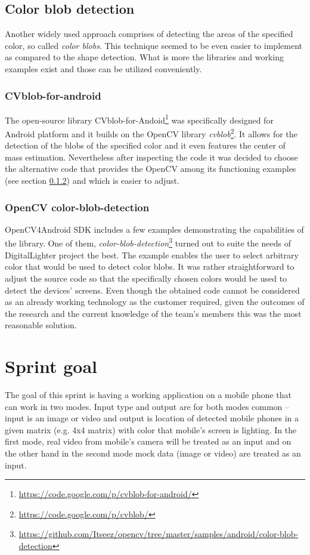 \subsection{Color blob detection}
Another widely used approach comprises of detecting the areas of the specified color, so called \textit{color blobs}. This technique seemed to be even easier to implement as compared to the shape detection. What is more the libraries and working examples exist and those can be utilized conveniently.

\subsubsection{CVblob-for-android}
The open-source library CVblob-for-Andoid\footnote{\url{https://code.google.com/p/cvblob-for-android/}} was specifically designed for Android platform and it builds on the OpenCV library \textit{cvblob}\footnote{\url{https://code.google.com/p/cvblob/}}. It allows for the detection of the blobs of the specified color and it even features the center of mass estimation. Nevertheless after inspecting the code it was decided to choose the alternative code that provides the OpenCV among its functioning examples (see section \ref{txt:sprint3_openCVcolorblob}) and which is easier to adjust.

\subsubsection{OpenCV color-blob-detection} \label{txt:sprint3_openCVcolorblob}
OpenCV4Android SDK includes a few examples demonstrating the capabilities of the library. One of them, \textit{color-blob-detection}\footnote{\url{https://github.com/Itseez/opencv/tree/master/samples/android/color-blob-detection}} turned out to suite the needs of DigitalLighter project the best. The example enables the user to select arbitrary color that would be used to detect color blobs. It was rather straightforward to adjust the source code so that the specifically chosen colors would be used to detect the devices' screens. Even though the obtained code cannot be considered as an already working technology as the customer required, given the outcomes of the research and the current knowledge of the team's members this was the most reasonable solution.




\section{Sprint goal}
The goal of this sprint is having a working application on a mobile phone that can work in two modes.  
Input type and output are for both modes common -- input is an image or video and output is location of detected mobile phones in a given matrix (e.g. 4x4 matrix) with color that mobile's screen is lighting.
In the first mode, real video from mobile's camera will be treated as an input and on the other hand in the second mode mock data (image or video) are treated as an input.

